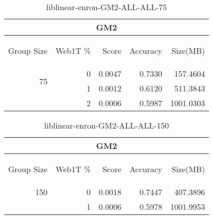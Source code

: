 \begin{center}
\begin{table}[htbp] 
 \begin{center}
\begin{tabular}{ | r | r | r | r | r |}
\hline
\multicolumn{5}{|c|}{GM2}\\
\hline
\begin{sideways}Group Size\end{sideways} & \begin{sideways}Web1T \%\end{sideways} & \begin{sideways}Score\end{sideways} & \begin{sideways}Accuracy\end{sideways} & \begin{sideways}Size(MB)\end{sideways}\\
\hline
\multirow{2}{*}{75}
 & 0 & 0.0047 & 0.7330 & 157.4604\\ \cline{2-5}
 & 1 & 0.0012 & 0.6120 & 511.3843\\ \cline{2-5}
 & 2 & 0.0006 & 0.5987 & 1001.0303\\ \cline{2-5}
\hline
\end{tabular}
\caption{liblinear-enron-GM2-ALL-ALL-75}
\label{table:liblinear-enron-GM2-ALL-ALL-75}
\end{center}
 \end{table}
\end{center}

\begin{center}
\begin{table}[htbp] 
 \begin{center}
\begin{tabular}{ | r | r | r | r | r |}
\hline
\multicolumn{5}{|c|}{GM2}\\
\hline
\begin{sideways}Group Size\end{sideways} & \begin{sideways}Web1T \%\end{sideways} & \begin{sideways}Score\end{sideways} & \begin{sideways}Accuracy\end{sideways} & \begin{sideways}Size(MB)\end{sideways}\\
\hline
\multirow{1}{*}{150}
 & 0 & 0.0018 & 0.7447 & 407.3896\\ \cline{2-5}
 & 1 & 0.0006 & 0.5978 & 1001.9953\\ \cline{2-5}
\hline
\end{tabular}
\caption{liblinear-enron-GM2-ALL-ALL-150}
\label{table:liblinear-enron-GM2-ALL-ALL-150}
\end{center}
 \end{table}
\end{center}

